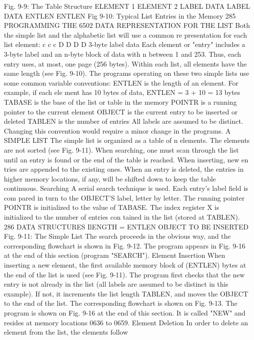 {Fig. 9-9: The Table Structure
ELEMENT
1
ELEMENT
2
LABEL
DATA
LABEL
DATA
ENTLEN
ENTLEN
Fig 9-10: Typical List Entries in the Memory
285
PROGRAMMING THE 6502
DATA REPRESENTATION FOR THE LIST
Both the simple list and the alphabetic list will use a common re
presentation for each list element:
c c c D D D D
3-byte label data
Each element or "entry" includes a 3-byte label and an n-byte
block of data with n between 1 and 253. Thus, each entry uses, at
most, one page (256 bytes). Within each list, all elements have the
same length (see Fig. 9-10). The programs operating on these two
simple lists use some common variable conventions:
ENTLEN is the length of an element. For example, if each ele
ment has 10 bytes of data, ENTLEN = 3 + 10 = 13 bytes
TABASE is the base of the list or table in the memory
POINTR is a running pointer to the current element
OBJECT is the current entry to be inserted or deleted
TABLEN is the number of entries
All labels are assumed to be distinct. Changing this convention
would require a minor change in the programs.
A SIMPLE LIST
The simple list is organized as a table of n elements. The
elements are not sorted (see Fig. 9-11).
When searching, one must scan through the list until an entry is
found or the end of the table is reached. When inserting, new en
tries are appended to the existing ones. When an entry is deleted,
the entries in higher memory locations, if any, will be shifted down
to keep the table continuous.
Searching
A serial search technique is used. Each entry's label field is com
pared in turn to the OBJECT'S label, letter by letter.
The running pointer POINTR is initialized to the value of
TABASE.
The index register X is initialized to the number of entries con
tained in the list (stored at TABLEN).
286
DATA STRUCTURES
IlENGTH =
ENTLEN
OBJECT
TO BE INSERTED
Fig. 9-11: The Simple List
The search proceeds in the obvious way, and the corresponding
flowchart is shown in Fig. 9-12. The program appears in Fig.
9-16 at the end of this section (program "SEARCH").
Element Insertion
When inserting a new element, the first available memory block
of (ENTLEN) bytes at the end of the list is used (see Fig. 9-11).
The program first checks that the new entry is not already in the
list (all labels are assumed to be distinct in this example). If not, it
increments the list length TABLEN, and moves the OBJECT to
the end of the list. The corresponding flowchart is shown on Fig.
9-13.
The program is shown on Fig. 9-16 at the end of this section. It is
called "NEW" and resides at memory locations 0636 to 0659.
Element Deletion
In order to delete an element from the list, the elements follow
}
